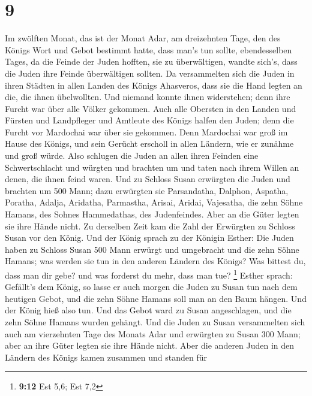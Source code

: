 \hypertarget{section-3}{%
\section{9}\label{section-3}}

 Im zwölften Monat, das ist der Monat Adar, am dreizehnten
Tage, den des Königs Wort und Gebot bestimmt hatte, dass man's tun
sollte, ebendesselben Tages, da die Feinde der Juden hofften, sie zu
überwältigen, wandte sich's, dass die Juden ihre Feinde überwältigen
sollten.  Da versammelten sich die Juden in ihren Städten in
allen Landen des Königs Ahasveros, dass sie die Hand legten an die, die
ihnen übelwollten. Und niemand konnte ihnen widerstehen; denn ihre
Furcht war über alle Völker gekommen.  Auch alle Obersten in
den Landen und Fürsten und Landpfleger und Amtleute des Königs halfen
den Juden; denn die Furcht vor Mardochai war über sie gekommen.
 Denn Mardochai war groß im Hause des Königs, und sein
Gerücht erscholl in allen Ländern, wie er zunähme und groß würde.
 Also schlugen die Juden an allen ihren Feinden eine
Schwertschlacht und würgten und brachten um und taten nach ihrem Willen
an denen, die ihnen feind waren.  Und zu Schloss Susan
erwürgten die Juden und brachten um 500 Mann;  dazu
erwürgten sie Parsandatha, Dalphon, Aspatha,  Poratha,
Adalja, Aridatha,  Parmastha, Arisai, Aridai, Vajesatha,
 die zehn Söhne Hamans, des Sohnes Hammedathas, des
Judenfeindes. Aber an die Güter legten sie ihre Hände nicht.
 Zu derselben Zeit kam die Zahl der Erwürgten zu Schloss
Susan vor den König.  Und der König sprach zu der Königin
Esther: Die Juden haben zu Schloss Susan 500 Mann erwürgt und umgebracht
und die zehn Söhne Hamans; was werden sie tun in den anderen Ländern des
Königs? Was bittest du, dass man dir gebe? und was forderst du mehr,
dass man tue? \footnote{\textbf{9:12} Est 5,6; Est 7,2} 
Esther sprach: Gefällt's dem König, so lasse er auch morgen die Juden zu
Susan tun nach dem heutigen Gebot, und die zehn Söhne Hamans soll man an
den Baum hängen.  Und der König hieß also tun. Und das
Gebot ward zu Susan angeschlagen, und die zehn Söhne Hamans wurden
gehängt.  Und die Juden zu Susan versammelten sich auch am
vierzehnten Tage des Monats Adar und erwürgten zu Susan 300 Mann; aber
an ihre Güter legten sie ihre Hände nicht.  Aber die
anderen Juden in den Ländern des Königs kamen zusammen und standen für
